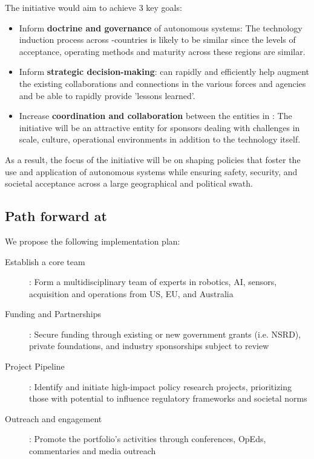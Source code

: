 \documentclass[11pt,letterpaper]{article}
\begin{document}
The initiative would aim to achieve 3 key goals: 

\begin{itemize}

\item Inform \textbf{doctrine and governance} of autonomous systems: The technology induction process across \auke-countries is likely to be similar since the levels of acceptance, operating methods and maturity across these regions are similar. 

\item Inform \textbf{strategic decision-making}: \org can rapidly and efficiently help augment the existing collaborations and connections in the various forces and agencies and be able to rapidly provide ’lessons learned’.

\item Increase \textbf{coordination and collaboration} between the entities in \auke: The initiative will be an attractive entity for sponsors dealing with challenges in scale, culture, operational environments in addition to the technology itself.

\end{itemize}

As a result, the focus of the initiative will be on shaping policies that foster the use and application of autonomous systems while ensuring safety, security, and societal acceptance across a large geographical and political swath.


\subsection{Path forward at \org}

We propose the following implementation plan:

\begin{description}

\item[Establish a core team]: Form a multidisciplinary team of \org
  experts in robotics, AI, sensors, acquisition and operations from \org US, EU, and Australia

\item[Funding and Partnerships]: Secure funding through existing or
  new government grants (i.e. NSRD), private foundations, and industry
  sponsorships subject to review

\item[Project Pipeline]: Identify and initiate high-impact policy
  research projects, prioritizing those with potential to influence
  regulatory frameworks and societal norms
  
\item[Outreach and engagement]: Promote the portfolio’s activities
  through conferences, OpEds, commentaries and media outreach


\end{description}
\end{document}
